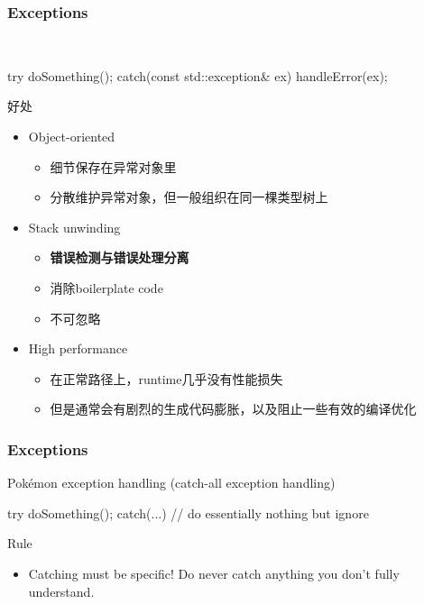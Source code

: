 \documentclass[UTF8,lualatex]{ctexbeamer}
\renewcommand{\emph}[1]{\textbf{#1}}
\begin{document}
\begin{frame}[fragile]
    \frametitle{Exceptions}
    \begin{exampleblock}{~}
        \footnotesize
        \begin{cppcode}
            try {
                doSomething();
            } catch(const std::exception& ex) {
                handleError(ex);
            }
        \end{cppcode}
    \end{exampleblock}
    \begin{block}{好处}
        \begin{itemize}
            \item Object-oriented
                \begin{itemize}
                    \item 细节保存在异常对象里
                    \item 分散维护异常对象，但一般组织在同一棵类型树上
                \end{itemize}
            \item Stack unwinding
                \begin{itemize}
                    \item \emph{错误检测与错误处理分离}
                    \item 消除boilerplate code
                    \item 不可忽略
                \end{itemize}
            \item High performance
                \begin{itemize}
                    \item 在正常路径上，runtime几乎没有性能损失
                    \item 但是通常会有剧烈的生成代码膨胀，以及阻止一些有效的编译优化
                \end{itemize}
        \end{itemize}
    \end{block}
\end{frame}

\begin{frame}[fragile]
    \frametitle{Exceptions}
    \begin{exampleblock}{Pokémon exception handling (catch-all exception handling)}
        \footnotesize
        \begin{cppcode}
            try {
                doSomething();
            } catch(...) {
                // do essentially nothing but ignore
            }
        \end{cppcode}
    \end{exampleblock}
    \begin{alertblock}{Rule}
        \begin{itemize}
            \item Catching must be specific!
                Do never catch anything you don't fully understand.
        \end{itemize}
    \end{alertblock}
\end{frame}
\end{document}
